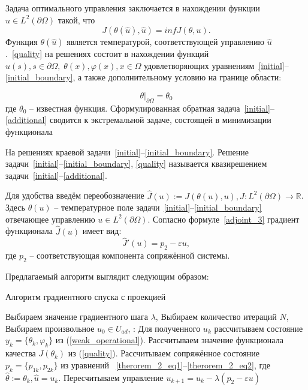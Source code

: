 \documentclass[10pt]{article}
\begin{document}
    Задача оптимального управления заключается в нахождении функции $\hat u \in L^2(\partial \Omega)$ такой, что
    \[J(\theta(\hat u), \hat u) = inf J(\theta, u).\]
    Функция $\theta(\hat u)$ является температурой, соответствующей управлению
    $\hat u$.~\eqref{quality} на решениях состоит в нахождении функций
    $u(s), s \in \partial \Omega,\; \theta(x), \varphi(x), x \in \Omega$ удовлетворяющих
    уравнениям~\eqref{initial}--\eqref{initial_boundary}, а также дополнительному условию на границе области:

    \begin{equation}
        \label{additional}
        \theta|_{\partial \Omega} = \theta_0
    \end{equation}
    где $\theta_0$ -- известная функция.
    Сформулированная обратная задача~\eqref{initial}--\eqref{additional} сводится к экстремальной задаче,
    состоящей в минимизации функционала

    На решениях краевой задачи~\eqref{initial}--\eqref{initial_boundary}.
    Решение задачи~\eqref{initial}--\eqref{initial_boundary}, \eqref{quality}
    называется квазирешением задачи~\eqref{initial}--\eqref{additional}.

    Для удобства введём переобозначение $\hat{J}(u):=J(\theta(u),u), \hat{J}:L^2(\partial \Omega) \to \mathbb{R}$.
    Здесь $\theta(u)$ -- температурное поле задачи~\eqref{initial}--\eqref{initial_boundary}
    отвечающее управлению $u \in L^2(\partial \Omega)$.
    Согласно формуле~\eqref{adjoint_3} градиент функционала $\hat J(u)$ имеет вид:
    \begin{equation}
        \label{j_gradient}
        \hat J'(u) = p_2 - \varepsilon u,
    \end{equation}
    где $p_2$ -- соответствующая компонента сопряжённой системы.

    Предлагаемый алгоритм выглядит следующим образом:
    \begin{algorithm}[H]
        \caption{Алгоритм градиентного спуска с проекцией}
        \begin{algorithmic}[1]
            \State Выбираем значение градиентного шага $\lambda$,
            \State Выбираем количество итераций $N$,
            \State Выбираем произвольное $u_0 \in U_{ad}$,
            :
            \State Для полученного $u_k$ рассчитываем состояние
            $y_k = \{\theta_k, \varphi_k\}$ из  (\ref{weak_operational}).
            \State Рассчитываем значение функционала качества $J(\theta_k)$ из (\ref{quality}).
            \State Рассчитываем сопряжённое состояние $p_k=\{p_{1k},p_{2k}\}$ из уравнений
            ~\eqref{therorem_2_eq1}--\eqref{therorem_2_eq2}, где $ \hat{\theta} := \theta_k, \hat{u}=u_k$.
            \State Пересчитываем управление $u_{k+1} = u_k - \lambda (p_2 - \varepsilon u)$
            \EndFor
        \end{algorithmic}
    \end{algorithm}
\end{document}
